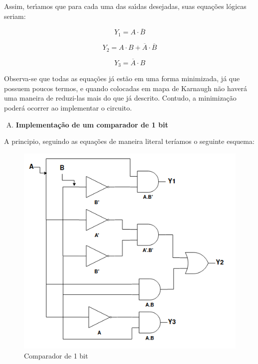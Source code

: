 \documentclass[12pt]{article}
\begin{document}
Assim, terı́amos que para cada uma das saı́das desejadas, suas equações lógicas seriam:

\begin{equation}
Y_{1} = A \cdot \overline{B}
\end{equation}

\begin{equation}
Y_{2} = A \cdot B + \overline{A} \cdot \overline{B}
\end{equation}

\begin{equation}
Y_{3} = \overline{A} \cdot B
\end{equation}

Observa-se que todas as equações já estão em uma forma minimizada, já que possuem poucos termos, e quando colocadas em mapa de Karnaugh não haverá uma maneira de reduzi-las mais do que já descrito. Contudo, a minimização poderá ocorrer ao implementar o circuito.

\begin{enumerate}[B)]
\item \textbf{Implementação de um comparador de 1 bit}
\end{enumerate}

A principio, seguindo as equações de maneira literal teríamos o seguinte esquema:

\begin{figure}[H]
    \centering
    \includegraphics[width=.9\textwidth]{Exp04/Comparador1Bit.png}
    \caption{Comparador de 1 bit}\label{fig:Comparador1Bit.png}
\end{figure}
\end{document}
